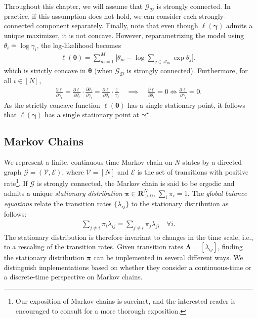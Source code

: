 Throughout this chapter, we will assume that $\mathcal{G}_{\mathcal{D}}$ is strongly connected.
In practice, if this assumption does not hold, we can consider each strongly-connected component separately.
Finally, note that even though $\ell(\bm{\gamma})$ admits a unique maximizer, it is not concave.
However, reparametrizing the model using $\theta_i \doteq \log \gamma_i$, the log-likelihood becomes
\begin{align*}
\ell(\bm{\theta}) = \sum_{m = 1}^M \bigg[ \theta_m - \log{\sum_{j \in \mathcal{A}_m} \exp \theta_j} \bigg],
\end{align*}
which is strictly concave in $\bm{\theta}$ (when $\mathcal{G}_{\mathcal{D}}$ is strongly connected).
Furthermore, for all $i \in [N]$,
\begin{align*}
\frac{\partial \ell}{\partial \gamma_i}
  = \frac{\partial \ell}{\partial \theta_i} \cdot \frac{\partial \theta_i}{\partial \gamma_i}
  = \frac{\partial \ell}{\partial \theta_i} \cdot \frac{1}{\gamma_i}
\quad \implies \quad
\frac{\partial \ell}{\partial \theta_i} = 0 \iff \frac{\partial \ell}{\partial \gamma_i} = 0.
\end{align*}
As the strictly concave function $\ell({\bm{\theta}})$ has a single stationary point, it follows that $\ell(\bm{\gamma})$ has a single stationary point at $\bm{\gamma}^\star$.


\subsection{Markov Chains}

We represent a finite, continuous-time Markov chain on $N$ states by a directed graph $\mathcal{G} = (\mathcal{V}, \mathcal{E})$, where $\mathcal{V} = [N]$ and $\mathcal{E}$ is the set of transitions with positive rate\footnote{%
Our exposition of Markov chains is succinct, and the interested reader is encouraged to consult \citet{levin2008markov} for a more thorough exposition.}.
If $\mathcal{G}$ is strongly connected, the Markov chain is said to be ergodic and admits a unique \emph{stationary distribution} $\bm{\pi} \in \mathbf{R}^N_{>0}$, $\sum_i \pi_i = 1$.
The \emph{global balance equations} relate the transition rates $\{ \lambda_{ij} \}$ to the stationary distribution as follows:
\begin{align}
\label{fi:eq:balance}
\sum_{j \ne i} \pi_i \lambda_{ij} = \sum_{j \ne i} \pi_j \lambda_{ji} \quad \forall i.
\end{align}
The stationary distribution is therefore invariant to changes in the time scale, i.e., to a rescaling of the transition rates.
Given transition rates $\bm{\Lambda} = [\lambda_{ij}]$, finding the stationary distribution $\bm{\pi}$ can be implemented in several different ways.
We distinguish implementations based on whether they consider a continuous-time or a discrete-time perspective on Markov chains.

